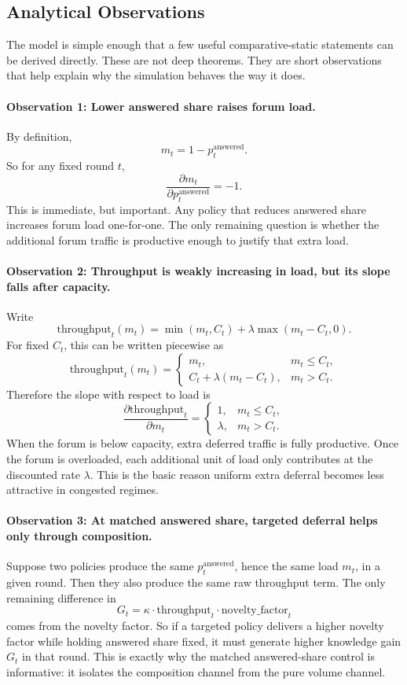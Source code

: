 \documentclass{article}
\begin{document}
\subsection{Analytical Observations}
The model is simple enough that a few useful comparative-static statements can be derived directly. These are not deep theorems. They are short observations that help explain why the simulation behaves the way it does.

\paragraph{Observation 1: Lower answered share raises forum load.}
By definition,
\[
m_t = 1 - p_t^{\text{answered}}.
\]
So for any fixed round $t$,
\[
\frac{\partial m_t}{\partial p_t^{\text{answered}}} = -1.
\]
This is immediate, but important. Any policy that reduces answered share increases forum load one-for-one. The only remaining question is whether the additional forum traffic is productive enough to justify that extra load.

\paragraph{Observation 2: Throughput is weakly increasing in load, but its slope falls after capacity.}
Write
\[
\text{throughput}_t(m_t)=\min(m_t,C_t)+\lambda \max(m_t-C_t,0).
\]
For fixed $C_t$, this can be written piecewise as
\[
\text{throughput}_t(m_t)=
\begin{cases}
m_t, & m_t \le C_t,\\
C_t + \lambda (m_t-C_t), & m_t > C_t.
\end{cases}
\]
Therefore the slope with respect to load is
\[
\frac{\partial \text{throughput}_t}{\partial m_t}=
\begin{cases}
1, & m_t \le C_t,\\
\lambda, & m_t > C_t.
\end{cases}
\]
When the forum is below capacity, extra deferred traffic is fully productive. Once the forum is overloaded, each additional unit of load only contributes at the discounted rate $\lambda$. This is the basic reason uniform extra deferral becomes less attractive in congested regimes.

\paragraph{Observation 3: At matched answered share, targeted deferral helps only through composition.}
Suppose two policies produce the same $p_t^{\text{answered}}$, hence the same load $m_t$, in a given round. Then they also produce the same raw throughput term. The only remaining difference in
\[
G_t = \kappa \cdot \text{throughput}_t \cdot \text{novelty\_factor}_t
\]
comes from the novelty factor. So if a targeted policy delivers a higher novelty factor while holding answered share fixed, it must generate higher knowledge gain $G_t$ in that round. This is exactly why the matched answered-share control is informative: it isolates the composition channel from the pure volume channel.
\end{document}
